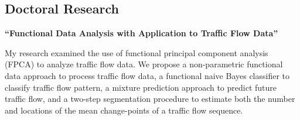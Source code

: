 \documentclass[10pt]{article} %
\begin{document}
\begin{paracol}{2}




  \section{Doctoral Research}

  {\raggedright\textbf{``Functional Data Analysis with Application to Traffic Flow Data''}\\}%
  My research examined the use of functional principal component analysis (FPCA) to analyze traffic flow data. We propose a non-parametric functional data approach to process traffic flow data, a functional naive Bayes classifier to classify traffic flow pattern, a mixture prediction approach to predict future traffic flow, and a two-step segmentation procedure to estimate both the number and locations of the mean change-points of a traffic flow sequence.



\end{paracol}
\end{document}
